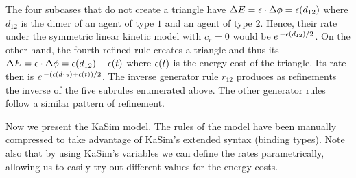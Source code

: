 The four subcases that do not create a triangle have
$\Delta E = \epsilon \cdot \Delta\phi = \epsilon(d_{12})$
where $d_{12}$ is the dimer of an agent of type $1$
and an agent of type $2$.
Hence, their rate under the symmetric linear kinetic model
with $c_r = 0$ would be $e^{\,-\epsilon(d_{12})/2}$.
On the other hand, the fourth refined rule creates a triangle
and thus its
$\Delta E = \epsilon \cdot \Delta\phi = \epsilon(d_{12}) + \epsilon(t)$
where $\epsilon(t)$ is the energy cost of the triangle.
Its rate then is $e^{\,-(\epsilon(d_{12})+\epsilon(t))/2}$.
The inverse generator rule $r^-_{12}$ produces as refinements
the inverse of the five subrules enumerated above.
The other generator rules follow a similar pattern
of refinement.

Now we present the KaSim model.
The rules of the model have been manually compressed
to take advantage of KaSim's extended syntax (\eg binding types).
Note also that by using KaSim's variables
we can define the rates parametrically,
allowing us to easily try out different values
for the energy costs.

